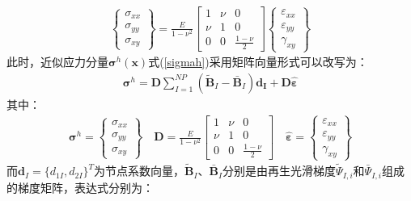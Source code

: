 \begin{equation}
\begin{split}
    \left\{\begin{matrix}
    \sigma_{xx}\\\sigma_{yy}\\\sigma_{xy}
    \end{matrix}\right\}=\frac{E}{1-\nu^2}
    \left[\begin{matrix}
    1&\nu&0\\\nu&1&0\\0&0&\frac{1-\nu}{2}
    \end{matrix}\right]
    \left\{\begin{matrix}
    \varepsilon_{xx}\\\varepsilon_{yy}\\\gamma_{xy}
 \end{matrix}\right\}
\end{split}
\end{equation}
此时，近似应力分量$\pmb{\sigma}^h(\pmb{x})$式(\ref{sigmah})采用矩阵向量形式可以改写为：
\begin{equation}
\begin{split}
\pmb{\sigma}^h=\pmb{D}\sum_{I=1}^{N\!P}(\tilde{\pmb{B}}_I-\bar{\pmb{B}}_I)\pmb{d_I}+\pmb{D}\hat{\pmb{\varepsilon}}
\end{split}
\end{equation}
其中：
\begin{equation}
\begin{split}
    \pmb{\sigma}^h=\left\{\begin{matrix}
        \sigma_{xx}\\\sigma_{yy}\\\sigma_{xy}
        \end{matrix}\right\}\quad
    \pmb{D}=\frac{E}{1-\nu^2}
    \left[\begin{matrix}
    1&\nu&0\\\nu&1&0\\0&0&\frac{1-\nu}{2}
    \end{matrix}\right]\quad
    \hat{\pmb{\varepsilon}}=\left\{\begin{matrix}
        \varepsilon_{xx}\\\varepsilon_{yy}\\\gamma_{xy}
     \end{matrix}\right\}
\end{split}
\end{equation}
而$\pmb{d}_I=\{d_{1I},d_{2I}\}^T$为节点系数向量，$\tilde{\pmb{B}}_I\text{、}\bar{\pmb{B}}_I$分别是由再生光滑梯度$\tilde{\Psi}_{I,i}$和$\bar{\Psi}_{I,i}$组成的梯度矩阵，表达式分别为：
